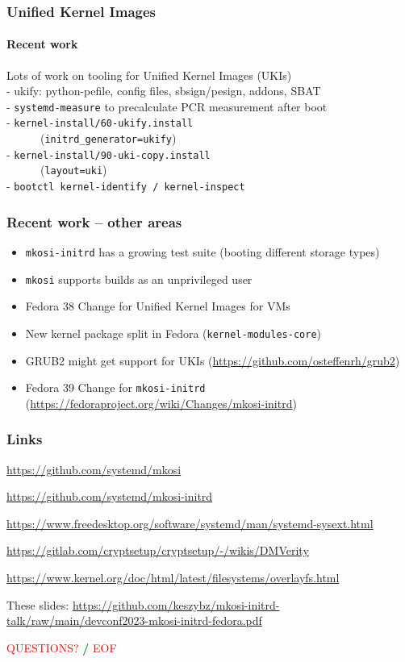 \documentclass[]{beamer}
\newcommand\pp\pause
\begin{document}
\begin{frame}[fragile]
  \frametitle{Unified Kernel Images}
  \framesubtitle{Recent work}

  Lots of work on tooling for Unified Kernel Images (UKIs)\\
  - ukify: python-pefile, config files, sbsign/pesign, addons, SBAT\\
  - \texttt{systemd-measure} to precalculate PCR measurement after boot\\
  - \texttt{kernel-install/60-ukify.install}\\
    ~~~~~~(\texttt{initrd\_generator=ukify})\\
  - \texttt{kernel-install/90-uki-copy.install}\\
    ~~~~~~(\texttt{layout=uki})\\

  - \texttt{bootctl kernel-identify / kernel-inspect}
\end{frame}

\begin{frame}
  \frametitle{Recent work – other areas}

  \begin{itemize}
  \item \texttt{mkosi-initrd} has a growing test suite (booting different storage types)
  \item \texttt{mkosi} supports builds as an unprivileged user
  \item Fedora 38 Change for Unified Kernel Images for VMs
  \item New kernel package split in Fedora (\texttt{kernel-modules-core})
  \item GRUB2 might get support for UKIs (\url{https://github.com/osteffenrh/grub2})
  \item Fedora 39 Change for \texttt{mkosi-initrd}
        (\small\url{https://fedoraproject.org/wiki/Changes/mkosi-initrd})
  \end{itemize}
\end{frame}

\begin{frame}[fragile]
  \frametitle{Links}

  \url{https://github.com/systemd/mkosi}

  \url{https://github.com/systemd/mkosi-initrd}

  \url{https://www.freedesktop.org/software/systemd/man/systemd-sysext.html}

  {
    \small
    \url{https://gitlab.com/cryptsetup/cryptsetup/-/wikis/DMVerity}\\
    }

  \url{https://www.kernel.org/doc/html/latest/filesystems/overlayfs.html}

  \quad

  These slides:
  \url{https://github.com/keszybz/mkosi-initrd-talk/raw/main/devconf2023-mkosi-initrd-fedora.pdf}

  \quad
  \pp

  \hfill \textcolor{red}{QUESTIONS?} \textcolor{green}{\bf /} \textcolor{red}{EOF} \hfill{}

\end{frame}
\end{document}

